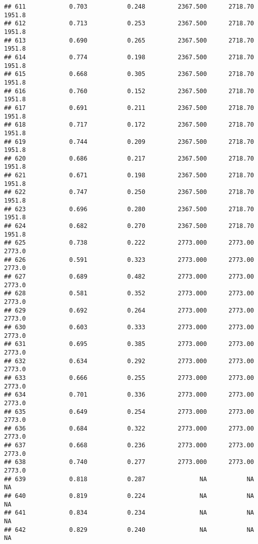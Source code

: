 \documentclass[
]{article}
\begin{document}
\begin{verbatim}
## 611            0.703           0.248         2367.500      2718.70       1951.8
## 612            0.713           0.253         2367.500      2718.70       1951.8
## 613            0.690           0.265         2367.500      2718.70       1951.8
## 614            0.774           0.198         2367.500      2718.70       1951.8
## 615            0.668           0.305         2367.500      2718.70       1951.8
## 616            0.760           0.152         2367.500      2718.70       1951.8
## 617            0.691           0.211         2367.500      2718.70       1951.8
## 618            0.717           0.172         2367.500      2718.70       1951.8
## 619            0.744           0.209         2367.500      2718.70       1951.8
## 620            0.686           0.217         2367.500      2718.70       1951.8
## 621            0.671           0.198         2367.500      2718.70       1951.8
## 622            0.747           0.250         2367.500      2718.70       1951.8
## 623            0.696           0.280         2367.500      2718.70       1951.8
## 624            0.682           0.270         2367.500      2718.70       1951.8
## 625            0.738           0.222         2773.000      2773.00       2773.0
## 626            0.591           0.323         2773.000      2773.00       2773.0
## 627            0.689           0.482         2773.000      2773.00       2773.0
## 628            0.581           0.352         2773.000      2773.00       2773.0
## 629            0.692           0.264         2773.000      2773.00       2773.0
## 630            0.603           0.333         2773.000      2773.00       2773.0
## 631            0.695           0.385         2773.000      2773.00       2773.0
## 632            0.634           0.292         2773.000      2773.00       2773.0
## 633            0.666           0.255         2773.000      2773.00       2773.0
## 634            0.701           0.336         2773.000      2773.00       2773.0
## 635            0.649           0.254         2773.000      2773.00       2773.0
## 636            0.684           0.322         2773.000      2773.00       2773.0
## 637            0.668           0.236         2773.000      2773.00       2773.0
## 638            0.740           0.277         2773.000      2773.00       2773.0
## 639            0.818           0.287               NA           NA           NA
## 640            0.819           0.224               NA           NA           NA
## 641            0.834           0.234               NA           NA           NA
## 642            0.829           0.240               NA           NA           NA

\end{verbatim}
\end{document}
